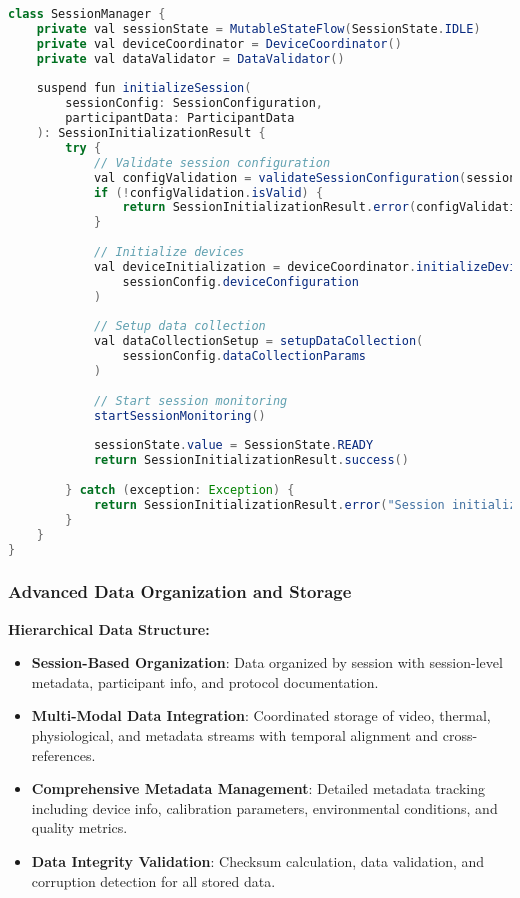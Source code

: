 \documentclass[11pt,a4paper]{report}
\begin{document}
\begin{lstlisting}[language=Java]
class SessionManager {
    private val sessionState = MutableStateFlow(SessionState.IDLE)
    private val deviceCoordinator = DeviceCoordinator()
    private val dataValidator = DataValidator()
    
    suspend fun initializeSession(
        sessionConfig: SessionConfiguration,
        participantData: ParticipantData
    ): SessionInitializationResult {
        try {
            // Validate session configuration
            val configValidation = validateSessionConfiguration(sessionConfig)
            if (!configValidation.isValid) {
                return SessionInitializationResult.error(configValidation.errors)
            }
            
            // Initialize devices
            val deviceInitialization = deviceCoordinator.initializeDevices(
                sessionConfig.deviceConfiguration
            )
            
            // Setup data collection
            val dataCollectionSetup = setupDataCollection(
                sessionConfig.dataCollectionParams
            )
            
            // Start session monitoring
            startSessionMonitoring()
            
            sessionState.value = SessionState.READY
            return SessionInitializationResult.success()
            
        } catch (exception: Exception) {
            return SessionInitializationResult.error("Session initialization failed: ${exception.message}")
        }
    }
}
\end{lstlisting}

\subsubsection{Advanced Data Organization and Storage}

\textbf{Hierarchical Data Structure:}
\begin{itemize}
  \item \textbf{Session-Based Organization}: Data organized by session with session-level metadata, participant info, and protocol documentation.
  \item \textbf{Multi-Modal Data Integration}: Coordinated storage of video, thermal, physiological, and metadata streams with temporal alignment and cross-references.
  \item \textbf{Comprehensive Metadata Management}: Detailed metadata tracking including device info, calibration parameters, environmental conditions, and quality metrics.
  \item \textbf{Data Integrity Validation}: Checksum calculation, data validation, and corruption detection for all stored data.
\end{itemize}
\end{document}
